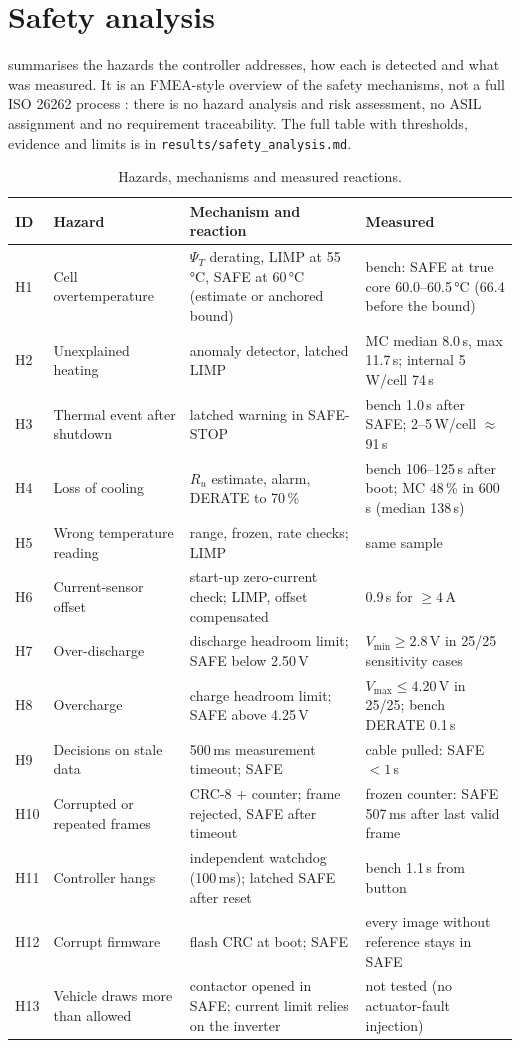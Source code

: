 \chapter{Safety analysis}\label{ch:safety}

 summarises the hazards the controller addresses, how each is detected and what was measured. It is an FMEA-style overview of the safety mechanisms, not a full ISO 26262 process \citep{iso26262}: there is no hazard analysis and risk assessment, no ASIL assignment and no requirement traceability. The full table with thresholds, evidence and limits is in \texttt{results/safety\_analysis.md}.

\begin{table}[htbp]\centering\scriptsize
\caption{Hazards, mechanisms and measured reactions.}\label{tab:fmea}
\begin{tabularx}{\linewidth}{@{}lXXX@{}}\toprule
ID & Hazard & Mechanism and reaction & Measured \\\midrule
H1 & Cell overtemperature & $\Psi_T$ derating, LIMP at 55\,°C, SAFE at 60\,°C (estimate or anchored bound) & bench: SAFE at true core 60.0--60.5\,°C (66.4 before the bound) \\
H2 & Unexplained heating & anomaly detector, latched LIMP & MC median 8.0\,s, max 11.7\,s; internal 5\,W/cell 74\,s \\
H3 & Thermal event after shutdown & latched warning in SAFE-STOP & bench 1.0\,s after SAFE; 2--5\,W/cell $\approx$91\,s \\
H4 & Loss of cooling & $R_u$ estimate, alarm, DERATE to 70\,\% & bench 106--125\,s after boot; MC 48\,\% in 600\,s (median 138\,s) \\
H5 & Wrong temperature reading & range, frozen, rate checks; LIMP & same sample \\
H6 & Current-sensor offset & start-up zero-current check; LIMP, offset compensated & 0.9\,s for $\ge4$\,A \\
H7 & Over-discharge & discharge headroom limit; SAFE below 2.50\,V & $V_\mathrm{min} \ge 2.8$\,V in 25/25 sensitivity cases \\
H8 & Overcharge & charge headroom limit; SAFE above 4.25\,V & $V_\mathrm{max} \le 4.20$\,V in 25/25; bench DERATE 0.1\,s \\
H9 & Decisions on stale data & 500\,ms measurement timeout; SAFE & cable pulled: SAFE $<1$\,s \\
H10 & Corrupted or repeated frames & CRC-8 + counter; frame rejected, SAFE after timeout & frozen counter: SAFE 507\,ms after last valid frame \\
H11 & Controller hangs & independent watchdog (100\,ms); latched SAFE after reset & bench 1.1\,s from button \\
H12 & Corrupt firmware & flash CRC at boot; SAFE & every image without reference stays in SAFE \\
H13 & Vehicle draws more than allowed & contactor opened in SAFE; current limit relies on the inverter & not tested (no actuator-fault injection) \\\bottomrule
\end{tabularx}
\end{table}

